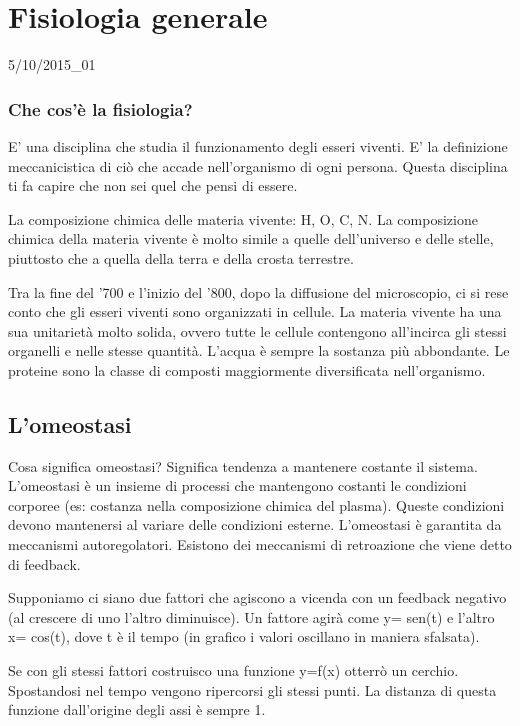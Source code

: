 \documentclass[]{article}
\begin{document}
\section{Fisiologia generale}\label{fisiologia-generale}

5/10/2015\_01

\subsubsection{Che cos'è la
fisiologia?}\label{che-cosuxe8-la-fisiologia}

E' una disciplina che studia il funzionamento degli esseri viventi. E'
la definizione meccanicistica di ciò che accade nell'organismo di ogni
persona. Questa disciplina ti fa capire che non sei quel che pensi di
essere.

La composizione chimica delle materia vivente: H, O, C, N. La
composizione chimica della materia vivente è molto simile a quelle
dell'universo e delle stelle, piuttosto che a quella della terra e della
crosta terrestre.

Tra la fine del '700 e l'inizio del '800, dopo la diffusione del
microscopio, ci si rese conto che gli esseri viventi sono organizzati in
cellule. La materia vivente ha una sua unitarietà molto solida, ovvero
tutte le cellule contengono all'incirca gli stessi organelli e nelle
stesse quantità. L'acqua è sempre la sostanza più abbondante. Le
proteine sono la classe di composti maggiormente diversificata
nell'organismo.

\subsection{L'omeostasi}\label{lomeostasi}

Cosa significa omeostasi? Significa tendenza a mantenere costante il
sistema. L'omeostasi è un insieme di processi che mantengono costanti le
condizioni corporee (es: costanza nella composizione chimica del
plasma). Queste condizioni devono mantenersi al variare delle condizioni
esterne. L'omeostasi è garantita da meccanismi autoregolatori. Esistono
dei meccanismi di retroazione che viene detto di feedback.

Supponiamo ci siano due fattori che agiscono a vicenda con un feedback
negativo (al crescere di uno l'altro diminuisce). Un fattore agirà come
y= sen(t) e l'altro x= cos(t), dove t è il tempo (in grafico i valori
oscillano in maniera sfalsata).

Se con gli stessi fattori costruisco una funzione y=f(x) otterrò un
cerchio. Spostandosi nel tempo vengono ripercorsi gli stessi punti. La
distanza di questa funzione dall'origine degli assi è sempre 1.
\end{document}
